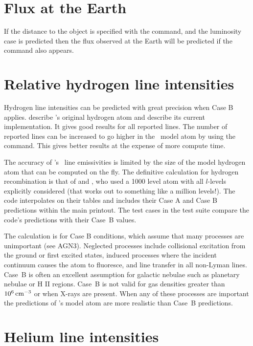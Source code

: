 \section{Flux at the Earth}

If the distance to the object is specified with the
 command,
and the luminosity case is predicted then the flux observed at the Earth
will be predicted if the  command
also appears.

\section{Relative hydrogen line intensities}

Hydrogen line intensities can be predicted with great precision when
Case B applies.
\citet{FergusonFerland1997} describe \Cloudy's
original hydrogen atom and
\citet{FerlandFabianEtAl2009} describe its current implementation.
It gives good results for all reported lines.
The number of reported lines can be increased to go higher in
the \hi\ model atom
by using the  command.
This gives better results at
the expense of more compute time.

The accuracy of \Cloudy's \hi\ line emissivities is limited by the size
of the model hydrogen atom that can be computed on the fly.
The definitive
calculation for hydrogen recombination is that of \citet{Hummer1987}
and \citet{Storey1995}, who used a 1000 level atom with all $l$-levels
explicitly considered
(that works out to something like a million levels!).
The code interpolates on their tables and includes their Case A and Case
B predictions within the main printout.
The test cases  in the test suite
compare the code's predictions with their Case~B values.

The \citet{Hummer1987} calculation is for Case B conditions, which
assume that many processes are unimportant (see AGN3).
Neglected processes include collisional excitation from the
ground or first excited states, induced processes where the incident
continuum causes the atom to fluoresce, and line transfer in all non-Lyman
lines.
Case~B is often an excellent assumption for galactic nebulae such
as planetary nebulae or H II regions.
Case~B is not valid for gas densities
greater than $10^6 {\rm\thinspace cm^{-3}}$ or when X-rays are present.
When any of these
processes are important the
predictions of \Cloudy's model atom are more realistic than Case~B
predictions.

\section{Helium line intensities}

